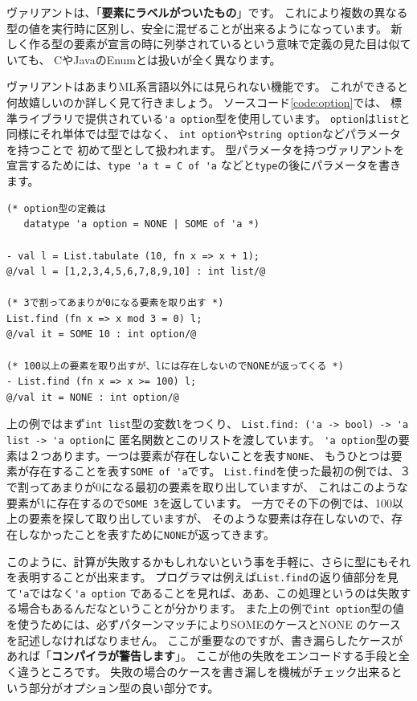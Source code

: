 \documentclass[11pt,a4paper]{article}
\begin{document}
ヴァリアントは、「\textbf{要素にラベルがついたもの}」です。
これにより複数の異なる型の値を実行時に区別し、安全に混ぜることが出来るようになっています。
新しく作る型の要素が宣言の時に列挙されているという意味で定義の見た目は似ていても、
CやJavaのEnumとは扱いが全く異なります。

ヴァリアントはあまりML系言語以外には見られない機能です。
これができると何故嬉しいのか詳しく見て行きましょう。
ソースコード\ref{code:option}では、
標準ライブラリで提供されている\lstinline{'a option}型を使用しています。
\lstinline{option}は\lstinline{list}と同様にそれ単体では型ではなく、
\lstinline{int option}や\lstinline{string option}などパラメータを持つことで
初めて型として扱われます。
型パラメータを持つヴァリアントを宣言するためには、\lstinline{type 'a t = C of 'a}
などと\lstinline{type}の後にパラメータを書きます。

\begin{lstlisting}[caption=オプション型,label=code:option]
(* option型の定義は
   datatype 'a option = NONE | SOME of 'a *)

- val l = List.tabulate (10, fn x => x + 1);
@/val l = [1,2,3,4,5,6,7,8,9,10] : int list/@

(* 3で割ってあまりが0になる要素を取り出す *)
List.find (fn x => x mod 3 = 0) l;
@/val it = SOME 10 : int option/@

(* 100以上の要素を取り出すが、lには存在しないのでNONEが返ってくる *)
- List.find (fn x => x >= 100) l;
@/val it = NONE : int option/@
\end{lstlisting}

上の例ではまず\lstinline{int list}型の変数\lstinline{l}をつくり、
\lstinline{List.find: ('a -> bool) -> 'a list -> 'a option}に
匿名関数とこのリストを渡しています。
\lstinline{'a option}型の要素は２つあります。一つは要素が存在しないことを表す\lstinline{NONE}、
もうひとつは要素が存在することを表す\lstinline{SOME of 'a}です。
\lstinline{List.find}を使った最初の例では、３で割ってあまりが0になる最初の要素を取り出していますが、
これはこのような要素が\lstinline{l}に存在するので\lstinline{SOME 3}を返しています。
一方でその下の例では、100以上の要素を探して取り出していますが、
そのような要素は存在しないので、存在しなかったことを表すために\lstinline{NONE}が返ってきます。

このように、計算が失敗するかもしれないという事を手軽に、さらに型にもそれを表明することが出来ます。
プログラマは例えば\lstinline{List.find}の返り値部分を見て\lstinline{'a}ではなく\lstinline{'a option}
であることを見れば、ああ、この処理というのは失敗する場合もあるんだなということが分かります。
また上の例で\lstinline{int option}型の値を使うためには、必ずパターンマッチによりSOMEのケースとNONE
のケースを記述しなければなりません。
ここが重要なのですが、書き漏らしたケースがあれば「{\bfseries コンパイラが警告します}」。
ここが他の失敗をエンコードする手段と全く違うところです。
失敗の場合のケースを書き漏しを機械がチェック出来るという部分がオプション型の良い部分です。
\end{document}
